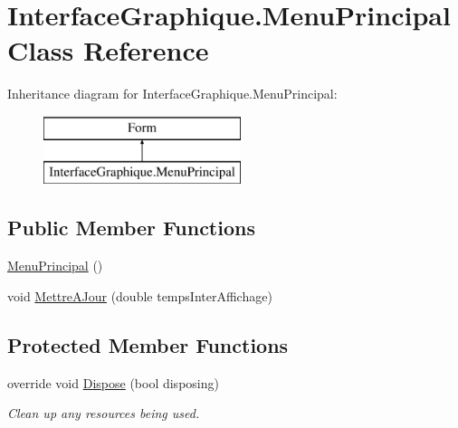 \hypertarget{class_interface_graphique_1_1_menu_principal}{\section{Interface\-Graphique.\-Menu\-Principal Class Reference}
\label{class_interface_graphique_1_1_menu_principal}
}
Inheritance diagram for Interface\-Graphique.\-Menu\-Principal\-:\begin{figure}[H]
\begin{center}
\leavevmode
\includegraphics[height=2.000000cm]{class_interface_graphique_1_1_menu_principal}
\end{center}
\end{figure}
\subsection*{Public Member Functions}
\begin{DoxyCompactItemize}
\item 
\hyperlink{class_interface_graphique_1_1_menu_principal_a4546e67aa4fd134bc376505facf1bf0c}{Menu\-Principal} ()
\item 
void \hyperlink{class_interface_graphique_1_1_menu_principal_a9597f3c586a63590d5c87cbe2cb16f7f}{Mettre\-A\-Jour} (double temps\-Inter\-Affichage)
\end{DoxyCompactItemize}
\subsection*{Protected Member Functions}
\begin{DoxyCompactItemize}
\item 
override void \hyperlink{class_interface_graphique_1_1_menu_principal_a5a9389c7864e1b29b7520f77606d357d}{Dispose} (bool disposing)
\begin{DoxyCompactList}\small\item\em Clean up any resources being used. \end{DoxyCompactList}\end{DoxyCompactItemize}


